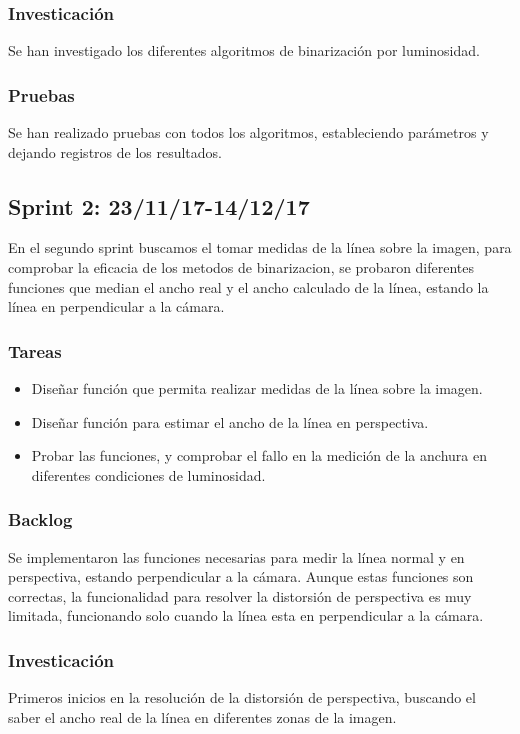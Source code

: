 \subsubsection{Investicación}
Se han investigado los diferentes algoritmos de binarización por luminosidad.

\subsubsection{Pruebas}
Se han realizado pruebas con todos los algoritmos, estableciendo parámetros y dejando registros de los resultados.

\subsection{Sprint 2: 23/11/17-14/12/17}
En el segundo sprint buscamos el tomar medidas de la línea sobre la imagen, para comprobar la eficacia de los metodos de binarizacion, se probaron diferentes funciones que median el ancho real y el ancho calculado de la línea, estando la línea en perpendicular a la cámara.

\subsubsection{Tareas}
\begin{itemize}

	\item Diseñar función que permita realizar medidas de la línea sobre la imagen.
	
	\item Diseñar función para estimar el ancho de la línea en perspectiva.
	
	\item Probar las funciones, y comprobar el fallo en la medición de la anchura en diferentes condiciones de luminosidad.
	
\end{itemize}

\subsubsection{Backlog}
Se implementaron las funciones necesarias para medir la línea normal y en perspectiva, estando perpendicular a la cámara. Aunque estas funciones son correctas, la funcionalidad para resolver la distorsión de perspectiva es muy limitada, funcionando solo cuando la línea esta en perpendicular a la cámara.

\subsubsection{Investicación}
Primeros inicios en la resolución de la distorsión de perspectiva, buscando el saber el ancho real de la línea en diferentes zonas de la imagen.

